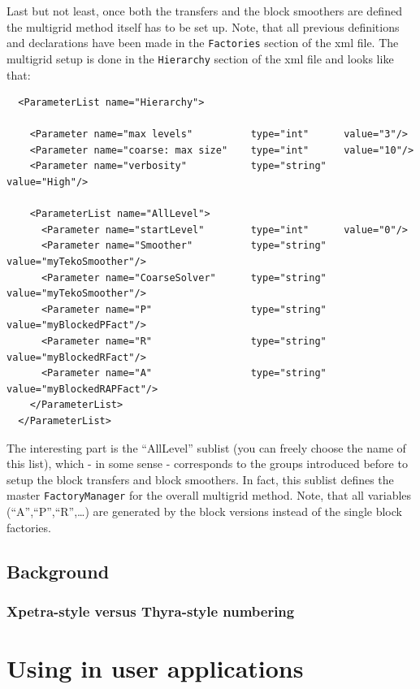 \documentclass[10pt,fleqn]{book}
\begin{document}
Last but not least, once both the transfers and the block smoothers are defined the multigrid method itself has to be set up.
Note, that all previous definitions and declarations have been made in the \texttt{Factories} section of the xml file. The multigrid setup is done in the \texttt{Hierarchy} section of the xml file and looks like that:

\begin{lstlisting}
  <ParameterList name="Hierarchy">

    <Parameter name="max levels"          type="int"      value="3"/>
    <Parameter name="coarse: max size"    type="int"      value="10"/>
    <Parameter name="verbosity"           type="string"   value="High"/>

    <ParameterList name="AllLevel">
      <Parameter name="startLevel"        type="int"      value="0"/>
      <Parameter name="Smoother"          type="string"   value="myTekoSmoother"/>
      <Parameter name="CoarseSolver"      type="string"   value="myTekoSmoother"/>
      <Parameter name="P"                 type="string"   value="myBlockedPFact"/>
      <Parameter name="R"                 type="string"   value="myBlockedRFact"/>
      <Parameter name="A"                 type="string"   value="myBlockedRAPFact"/>
    </ParameterList>
  </ParameterList>
\end{lstlisting}

The interesting part is the ``AllLevel'' sublist (you can freely choose the name of this list), which - in some sense - corresponds to the groups introduced before to setup the block transfers and block smoothers. In fact, this sublist defines the master \texttt{FactoryManager} for the overall multigrid method. Note, that all variables (``A'',``P'',``R'',\ldots) are generated by the block versions instead of the single block factories.


\section{Background}

\subsection{Xpetra-style versus Thyra-style numbering}
\label{sec:xpetraversusthyra}


\chapter{Using \muelu in user applications}
\end{document}

